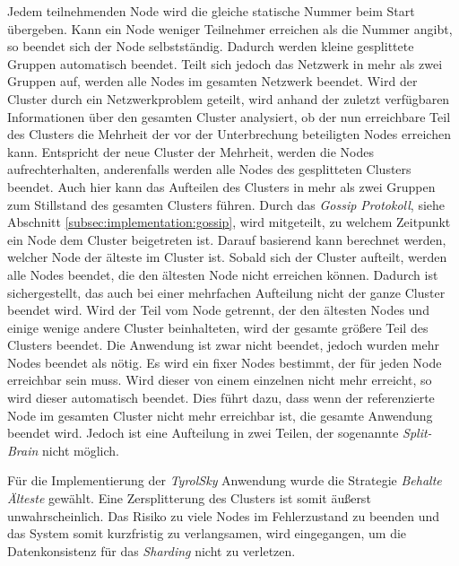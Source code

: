 \begin{itemize}
  Jedem teilnehmenden Node wird die gleiche statische Nummer beim Start übergeben. Kann ein Node weniger Teilnehmer erreichen als die Nummer angibt, so beendet sich der Node selbstständig. Dadurch werden kleine gesplittete Gruppen automatisch beendet. Teilt sich jedoch das Netzwerk in mehr als zwei Gruppen auf, werden alle Nodes im gesamten Netzwerk beendet. 
  Wird der Cluster durch ein Netzwerkproblem geteilt, wird anhand der zuletzt verfügbaren Informationen über den gesamten Cluster analysiert, ob der nun erreichbare Teil des Clusters die Mehrheit der vor der Unterbrechung beteiligten Nodes erreichen kann. Entspricht der neue Cluster der Mehrheit, werden die Nodes aufrechterhalten, anderenfalls werden alle Nodes des gesplitteten Clusters beendet. Auch hier kann das Aufteilen des Clusters in mehr als zwei Gruppen zum Stillstand des gesamten Clusters führen.
  Durch das \textit{Gossip Protokoll}, siehe Abschnitt \ref{subsec:implementation:gossip}, wird mitgeteilt, zu welchem Zeitpunkt ein Node dem Cluster beigetreten ist. Darauf basierend kann berechnet werden, welcher Node der älteste im Cluster ist. Sobald sich der Cluster aufteilt, werden alle Nodes beendet, die den ältesten Node nicht erreichen können. Dadurch ist sichergestellt, das auch bei einer mehrfachen Aufteilung nicht der ganze Cluster beendet wird. Wird der Teil vom Node getrennt, der den ältesten Nodes und einige wenige andere Cluster beinhalteten, wird der gesamte größere Teil des Clusters beendet. Die Anwendung ist zwar nicht beendet, jedoch wurden mehr Nodes beendet als nötig. 
  Es wird ein fixer Nodes bestimmt, der für jeden Node erreichbar sein muss. Wird dieser von einem einzelnen nicht mehr erreicht, so wird dieser automatisch beendet. Dies führt dazu, dass wenn der referenzierte Node im gesamten Cluster nicht mehr erreichbar ist, die gesamte Anwendung beendet wird. Jedoch ist eine Aufteilung in zwei Teilen, der sogenannte \textit{Split-Brain} nicht möglich.
\end{itemize}
Für die Implementierung der \textit{TyrolSky} Anwendung wurde die Strategie \textit{Behalte Älteste} gewählt. Eine Zersplitterung des Clusters ist somit äußerst unwahrscheinlich. Das Risiko zu viele Nodes im Fehlerzustand zu beenden und das System somit kurzfristig zu verlangsamen, wird eingegangen, um die Datenkonsistenz für das \textit{Sharding} nicht zu verletzen.  

